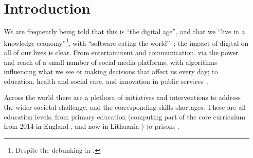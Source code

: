 \documentclass[sigconf]{acmart}
\begin{document}

\maketitle


\section{Introduction}

We are frequently being told that this is ``the digital age'', and
that we ``live in a knowledge economy''\footnote{Despite the debunking in \cite{Friesen2008}.}, with ``software eating the
world''~\cite{andreessen:2011}; the impact of digital on all of our
lives is clear. From entertainment and communication, via the power
and reach of a small number of social media platforms, with algorithms
influencing what we see or making decisions that affect us every day;
to education, health and social care, and innovation in public
services~\cite{ecdsmsuk:2018}.

Across the world there are a plethora of initiatives and interventions
to address the wider societal challenge, and the corresponding skills
shortages. These are all education levels, from primary education
(computing part of the core curriculum from 2014 in England
\cite{brown-et-al:sigcse2013,DfE2013a}, and now in Lithuania
\cite{Xinhua2018a}) to prisons \cite{Maher2018a}.
\end{document}

